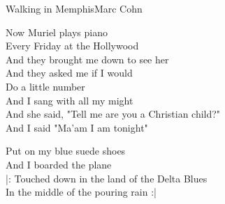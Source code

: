 \begin{song}{Walking in Memphis}{Marc Cohn}
\smallskip
\begin{guitar}
Now Muriel plays piano \\
Every Friday at the Hollywood \\
And they brought me down to see her \\
And they asked me if I would\\
Do a little number \\
And I sang with all my might\\
And she said, "Tell me are you a Christian child?" \\
And I said "Ma'am I am tonight" \\
\end{guitar}


\smallskip
\begin{guitar}
Put on my blue suede shoes\\
And I boarded the plane \\
|: Touched down in the land of the Delta Blues \\
In the middle of the pouring rain :|\\
\end{guitar}

\end{song}
